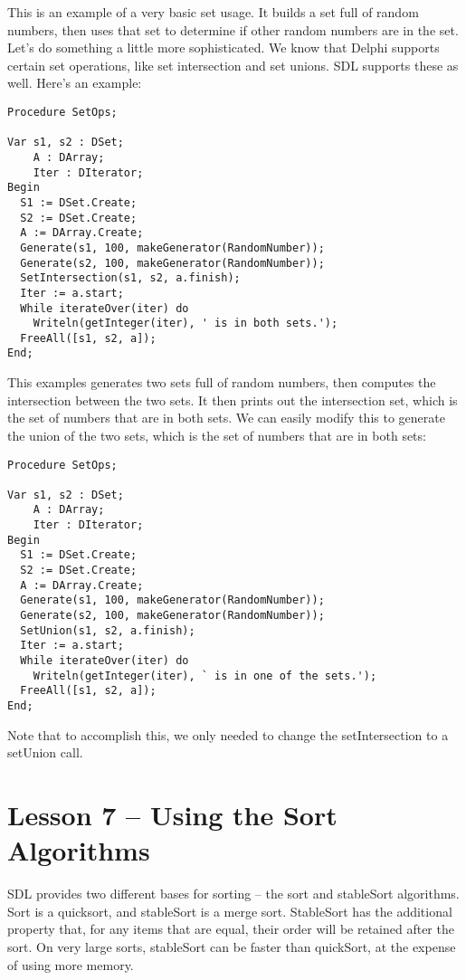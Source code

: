 \documentclass{report}
\begin{document}
This is an example of a very basic set usage. It builds a set full of random
numbers, then uses that set to determine if other random numbers are in the
set. Let's do something a little more sophisticated. We know that Delphi
supports certain set operations, like set intersection and set unions. SDL
supports these as well.  Here's an example:

\begin{lstlisting}
Procedure SetOps;

Var s1, s2 : DSet;
    A : DArray;
    Iter : DIterator;
Begin
  S1 := DSet.Create;
  S2 := DSet.Create;
  A := DArray.Create;
  Generate(s1, 100, makeGenerator(RandomNumber));
  Generate(s2, 100, makeGenerator(RandomNumber));
  SetIntersection(s1, s2, a.finish);
  Iter := a.start;
  While iterateOver(iter) do
    Writeln(getInteger(iter), ' is in both sets.');
  FreeAll([s1, s2, a]);
End;
\end{lstlisting}

This examples generates two sets full of random numbers, then computes the
intersection between the two sets. It then prints out the intersection set,
which is the set of numbers that are in both sets. We can easily modify this
to generate the union of the two sets, which is the set of numbers that are
in both sets:

\begin{lstlisting}
Procedure SetOps;

Var s1, s2 : DSet;
    A : DArray;
    Iter : DIterator;
Begin
  S1 := DSet.Create;
  S2 := DSet.Create;
  A := DArray.Create;
  Generate(s1, 100, makeGenerator(RandomNumber));
  Generate(s2, 100, makeGenerator(RandomNumber));
  SetUnion(s1, s2, a.finish);
  Iter := a.start;
  While iterateOver(iter) do
    Writeln(getInteger(iter), ` is in one of the sets.');
  FreeAll([s1, s2, a]);
End;
\end{lstlisting}

Note that to accomplish this, we only needed to change 
the setIntersection to a setUnion call.

\section{Lesson 7 -- Using the Sort Algorithms}

SDL provides two different bases for sorting -- the sort and stableSort
algorithms. Sort is a quicksort, and stableSort is a merge sort. StableSort
has the additional property that, for any items that are equal, their order
will be retained after the sort. On very large sorts, stableSort can be
faster than quickSort, at the expense of using more memory.
\end{document}
